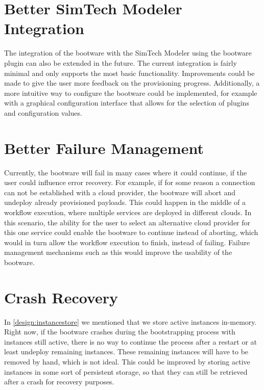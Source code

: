\section{Better SimTech Modeler Integration}

The integration of the bootware with the SimTech Modeler using the bootware plugin can also be extended in the future.
The current integration is fairly minimal and only supports the most basic functionality.
Improvements could be made to give the user more feedback on the provisioning progress.
Additionally, a more intuitive way to configure the bootware could be implemented, for example with a graphical configuration interface that allows for the selection of plugins and configuration values.

\section{Better Failure Management}

Currently, the bootware will fail in many cases where it could continue, if the user could influence error recovery.
For example, if for some reason a connection can not be established with a cloud provider, the bootware will abort and undeploy already provisioned payloads.
This could happen in the middle of a workflow execution, where multiple services are deployed in different clouds.
In this scenario, the ability for the user to select an alternative cloud provider for this one service could enable the bootware to continue instead of aborting, which would in turn allow the workflow execution to finish, instead of failing.
Failure management mechanisms such as this would improve the usability of the bootware.

\section{Crash Recovery}

In \autoref{design:instancestore} we mentioned that we store active instances in-memory.
Right now, if the bootware crashes during the bootstrapping process with instances still active, there is no way to continue the process after a restart or at least undeploy remaining instances.
These remaining instances will have to be removed by hand, which is not ideal.
This could be improved by storing active instances in some sort of persistent storage, so that they can still be retrieved after a crash for recovery purposes.

